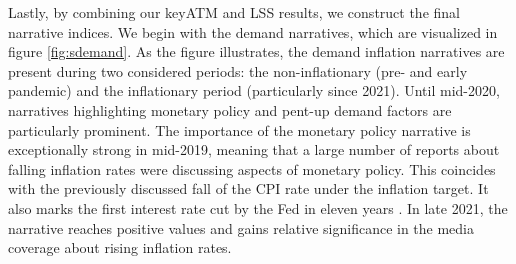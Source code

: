 Lastly, by combining our \textsf{keyATM} and \textsf{LSS} results, we construct the final narrative indices. We begin with the demand narratives, which are visualized in figure \ref{fig:sdemand}. As the figure illustrates, the demand inflation narratives are present during two considered periods: the non-inflationary (pre- and early pandemic) and the inflationary period (particularly since 2021). Until mid-2020, narratives highlighting monetary policy and pent-up demand factors are particularly prominent. The importance of the monetary policy narrative is exceptionally strong in mid-2019, meaning that a large number of reports about falling inflation rates were discussing aspects of monetary policy. This coincides with the previously discussed fall of the CPI rate under the inflation target. It also marks the first interest rate cut by the Fed in eleven years \citep{fed.2019}. In late 2021, the narrative reaches positive values and gains relative significance in the media coverage about rising inflation rates.
